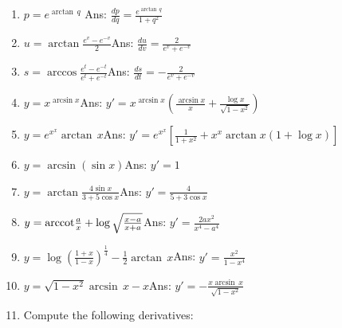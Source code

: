 \begin{enumerate}
\item
$p = e^{\arctan\, q}$ \qquad\qquad\qquad\qquad\qquad\qquad Ans:  	
$\frac{dp}{dq} 	= \frac{e^{\arctan\, q}}{1 + q^2}$

\item
$u = \arctan \frac{e^v - e^{-v}}{2}$\qquad\qquad\qquad\qquad\qquad\qquad Ans:  	
$\frac{du}{dv} 	= \frac{2}{e^v + e^{-v}}$

\item
$s = \arccos \frac{e^t - e^{-t}}{e^t + e^{-t}}$\qquad\qquad\qquad\qquad\qquad\qquad Ans:  
$\frac{ds}{dt} 	= -\frac{2}{e^v + e^{-v}}$

\item
$y = x^{\arcsin x}$\qquad\qquad\qquad\qquad\qquad\qquad Ans:  	
$y' = x^{\arcsin x} \left ( \frac{\arcsin x}{x} + \frac{\log x}{\sqrt{1 - x^2}} \right )$

\item
$y = e^{x^x} \arctan\, x$\qquad\qquad\qquad\qquad\qquad\qquad Ans:  	
$y' 	= e^{x^x} \left [ \frac{1}{1 + x^2} + x^x \arctan x (1 + \log x) \right ]$

\item
$y = \arcsin( \sin x )$\qquad\qquad\qquad\qquad\qquad\qquad Ans:  	
$y' = 1$

\item
$y = \arctan \frac{4 \sin x}{3 + 5 \cos x}$\qquad\qquad\qquad\qquad\qquad\qquad Ans:  
$y' 	= \frac{4}{5 + 3 \cos x}$

\item
$y = {\rm arccot} \frac{a}{x} + \log \sqrt{\frac{x - a}{x + a}}$\qquad\qquad\qquad\qquad\qquad\qquad Ans:  	
$y' 	= \frac{2ax^2}{x^4 - a^4}$

\item
$y = \log \left ( \frac{1 + x}{1 - x} \right )^{\frac{1}{4}} - \frac{1}{2} \arctan\, x$\qquad\qquad\qquad\qquad\qquad\qquad Ans:  
$y' 	= \frac{x^2}{1 - x^4}$

\item
$y = \sqrt{1 - x^2} \arcsin\, x - x$\qquad\qquad\qquad\qquad\qquad\qquad Ans:  	
$y' 	= - \frac{x \arcsin\, x}{\sqrt{1 - x^2}}$

\item
Compute the following derivatives:


\end{enumerate}
